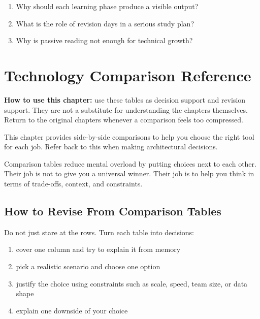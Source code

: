 \documentclass[12pt, a4paper, oneside]{book}
\begin{document}
\begin{recallbox}
\begin{enumerate}[leftmargin=2em]
    \item Why should each learning phase produce a visible output?
    \item What is the role of revision days in a serious study plan?
    \item Why is passive reading not enough for technical growth?
\end{enumerate}
\end{recallbox}




\chapter{Technology Comparison Reference}

\begin{studybox}
\textbf{How to use this chapter:} use these tables as decision support and revision support. They are not a substitute for understanding the chapters themselves. Return to the original chapters whenever a comparison feels too compressed.
\end{studybox}

This chapter provides side-by-side comparisons to help you choose the right tool for each job. Refer back to this when making architectural decisions.

\begin{intuitionbox}
Comparison tables reduce mental overload by putting choices next to each other. Their job is not to give you a universal winner. Their job is to help you think in terms of trade-offs, context, and constraints.
\end{intuitionbox}

\section{How to Revise From Comparison Tables}

Do not just stare at the rows. Turn each table into decisions:
\begin{enumerate}[leftmargin=2em]
    \item cover one column and try to explain it from memory
    \item pick a realistic scenario and choose one option
    \item justify the choice using constraints such as scale, speed, team size, or data shape
    \item explain one downside of your choice
\end{enumerate}
\end{document}
